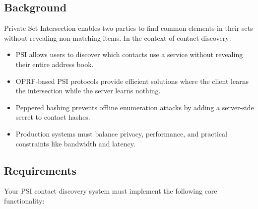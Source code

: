 \documentclass[10pt,a4paper,american]{exam}
\begin{document}
\subsection*{Background}
Private Set Intersection enables two parties to find common elements in their sets without revealing non-matching items. In the context of contact discovery:
\begin{itemize}
	\item PSI allows users to discover which contacts use a service without revealing their entire address book.
	\item OPRF-based PSI protocols provide efficient solutions where the client learns the intersection while the server learns nothing.
	\item Peppered hashing prevents offline enumeration attacks by adding a server-side secret to contact hashes.
	\item Production systems must balance privacy, performance, and practical constraints like bandwidth and latency.
\end{itemize}

\subsection*{Requirements}
Your PSI contact discovery system must implement the following core functionality:
\end{document}
